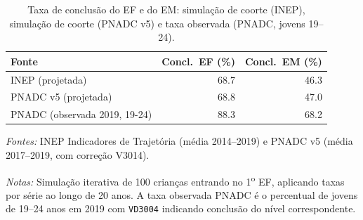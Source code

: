 \begin{table}[htbp]\centering
\caption{Taxa de conclus\~ao do EF e do EM: simula\c{c}\~ao de coorte (INEP), simula\c{c}\~ao de coorte (PNADC v5) e taxa observada (PNADC, jovens 19--24).}
\label{tab:t7_completion}
\begin{threeparttable}\small
\begin{tabular}{lrr}\toprule
Fonte & Concl.\ EF (\%) & Concl.\ EM (\%) \\\midrule
INEP (projetada) & 68.7 & 46.3 \\
PNADC v5 (projetada) & 68.8 & 47.0 \\
PNADC (observada 2019, 19-24) & 88.3 & 68.2 \\
\bottomrule\end{tabular}
\begin{tablenotes}\footnotesize
\item \textit{Fontes:} INEP Indicadores de Trajet\'oria (m\'edia 2014--2019) e PNADC v5 (m\'edia 2017--2019, com corre\c{c}\~ao V3014).
\item \textit{Notas:} Simula\c{c}\~ao iterativa de 100 crian\c{c}as entrando no 1\textsuperscript{o} EF, aplicando taxas por s\'erie ao longo de 20 anos. A taxa observada PNADC \'e o percentual de jovens de 19--24 anos em 2019 com \texttt{VD3004} indicando conclus\~ao do n\'ivel correspondente.
\end{tablenotes}\end{threeparttable}\end{table}
